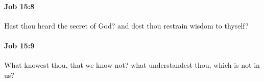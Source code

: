 		\paragraph{Job 15:8} %
			\label{JOB-15-8}

			Hast thou heard the secret of God? and dost thou restrain wisdom to thyself?


		\paragraph{Job 15:9} %
			\label{JOB-15-9}

			What knowest thou, that we know not? what understandest thou, which is not in us?


